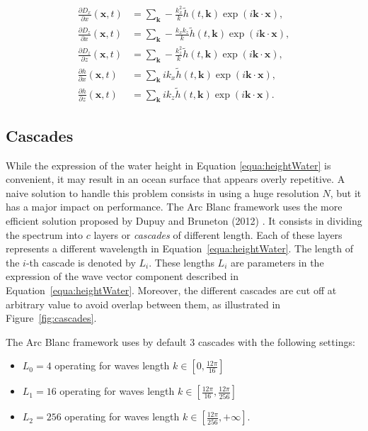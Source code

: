 \documentclass[final]{jcgt}
\def\Framework{The Arc Blanc framework\xspace}
\begin{document}
\begin{align*}
	\frac{\partial D_x}{\partial x}(\mathbf x,t) & = \sum_{\mathbf{k}} -\frac{k_x^2}{k} \tilde{h}(t, \mathbf{k})\exp\left( i \mathbf{k}\cdot \mathbf x\right),  \\
	\frac{\partial D_z}{\partial x}(\mathbf x,t) & = \sum_{\mathbf{k}} -\frac{k_xk_z}{k} \tilde{h}(t, \mathbf{k})\exp\left( i \mathbf{k}\cdot \mathbf x\right), \\
	\frac{\partial D_z}{\partial z}(\mathbf x,t) & = \sum_{\mathbf{k}} -\frac{k_z^2}{k} \tilde{h}(t, \mathbf{k})\exp\left( i \mathbf{k}\cdot \mathbf x\right),  \\
	\frac{\partial h}{\partial x}(\mathbf x,t)   & = \sum_{\mathbf{k}} ik_x \tilde{h}(t, \mathbf{k})\exp\left( i \mathbf{k}\cdot \mathbf x\right),              \\
	\frac{\partial h}{\partial z}(\mathbf x,t)   & = \sum_{\mathbf{k}} ik_z \tilde{h}(t, \mathbf{k})\exp\left( i \mathbf{k}\cdot \mathbf x\right).
\end{align*}

\subsection{Cascades}
\label{subsec:cascades}
While the expression of the water height in Equation \ref{equa:heightWater} is convenient, it may result in an ocean surface that appears overly repetitive.
A naive solution to handle this problem consists in using a huge resolution $N$, but it has a major impact on performance.
\Framework uses the more efficient solution proposed by Dupuy and Bruneton (2012) \cite{dupuyRealtimeAnimationRendering2012}.
It consists in dividing the spectrum into $c$ layers or \emph{cascades} of different length.
Each of these layers represents a different wavelength in Equation~\ref{equa:heightWater}.
The length of the $i$-th cascade is denoted by $L_i$.
These lengths $L_i$ are parameters in the expression of the wave vector component described in Equation~\ref{equa:heightWater}.
Moreover, the different cascades are cut off at arbitrary value to avoid overlap between them, as illustrated in Figure~\ref{fig:cascades}.

\Framework uses by default $3$ cascades with the following settings:
\begin{itemize}
	\item $L_0 = 4$ operating for waves length $k\in [0,\frac{12\pi}{16}]$
	\item $L_1 = 16$ operating for waves length $k\in [\frac{12\pi}{16},\frac{12\pi}{256}]$
	\item $L_2 = 256$ operating for waves length $k\in [\frac{12\pi}{256},+\infty]$.
\end{itemize}
\end{document}
